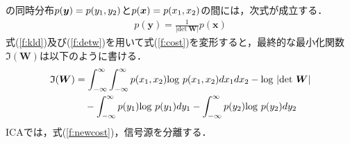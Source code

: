 の同時分布$p(\bm{y}) = p(\textcolor{black}{y_1,y_2}) $と$p(\bm{x}) = p(\textcolor{black}{x_1,x_2})$の間には，次式が成立する．
\begin{align}
    p(\bm{y}) = \frac{1}{|\mathrm{det}~\bm{W}|}p(\bm{x}) \label{f:detw}
\end{align}
式(\ref{f:kld})及び(\ref{f:detw})を用いて式(\ref{f:cost})を変形すると，最終的な最小化関数$\mathfrak{I}(\bm{W})$は以下のように書ける．
\begin{align}
\begin{split}
  \mathfrak{I}(\bm{W}) &= \int_{-\infty}^{\infty} \int_{-\infty}^{\infty} p(x_1,x_2){\rm log}~p(x_1,x_2)dx_1 dx_2 - {\rm log}~|\mathrm{det}~\bm{W}|\\
  &\quad -\int_{-\infty}^{\infty} p(y_1){\rm log}~p(y_1)dy_1 - \int_{-\infty}^{\infty} p(y_2){\rm log}~p(y_2)dy_2    \label{f:newcost}
\end{split}
\end{align}
ICAでは，式(\ref{f:newcost})，信号源を分離する．

